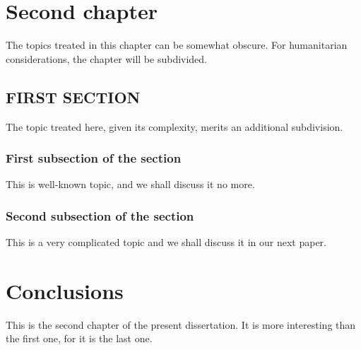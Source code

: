 \documentclass[final]{pittetd}%
\begin{document}
\chapter{Second chapter}
The topics treated in this chapter can be somewhat obscure. For humanitarian considerations, the chapter will be subdivided.
\section{FIRST SECTION}%
The topic treated here, given its complexity, merits an additional subdivision.
\subsection{First subsection of the section}
This is well-known topic, and we shall discuss it no more.
\subsection{Second subsection of the section}
This is a very complicated topic and we shall discuss it in our next paper.
\chapter{Conclusions}
This is the second chapter of the present dissertation. It is more interesting than the first one, for it is the last one.
%
%
\end{document}
